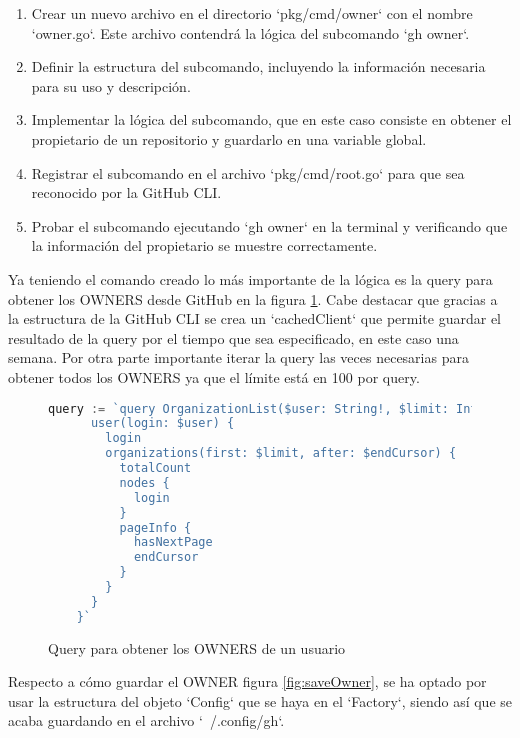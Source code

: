 \begin{enumerate}
  \item Crear un nuevo archivo en el directorio `pkg/cmd/owner` con el nombre `owner.go`. Este archivo contendrá la lógica del subcomando `gh owner`.
  \item Definir la estructura del subcomando, incluyendo la información necesaria para su uso y descripción.
  \item Implementar la lógica del subcomando, que en este caso consiste en obtener el propietario de un repositorio y guardarlo en una variable global.
  \item Registrar el subcomando en el archivo `pkg/cmd/root.go` para que sea reconocido por la GitHub CLI.
  \item Probar el subcomando ejecutando `gh owner` en la terminal y verificando que la información del propietario se muestre correctamente.
\end{enumerate}

Ya teniendo el comando creado lo más importante de la lógica es la query para obtener los OWNERS desde GitHub en la figura \ref{fig:queryOwners}. Cabe destacar que gracias a la estructura de la GitHub CLI se crea un `cachedClient` que permite guardar el resultado de la query por el tiempo que sea especificado, en este caso una semana. Por otra parte importante iterar la query las veces necesarias para obtener todos los OWNERS ya que el límite está en 100 por query.

\begin{figure}[H]
  \begin{lstlisting}[language=GO]
    query := `query OrganizationList($user: String!, $limit: Int!, $endCursor: String) {
      user(login: $user) {
        login
        organizations(first: $limit, after: $endCursor) {
          totalCount
          nodes {
            login
          }
          pageInfo {
            hasNextPage
            endCursor
          }
        }
      }
    }`
  \end{lstlisting}
  \caption{Query para obtener los OWNERS de un usuario}
  \label{fig:queryOwners}
\end{figure}

Respecto a cómo guardar el OWNER figura \ref{fig:saveOwner}, se ha optado por usar la estructura del objeto `Config` que se haya en el `Factory`, siendo así que se acaba guardando en el archivo `~/.config/gh`.


